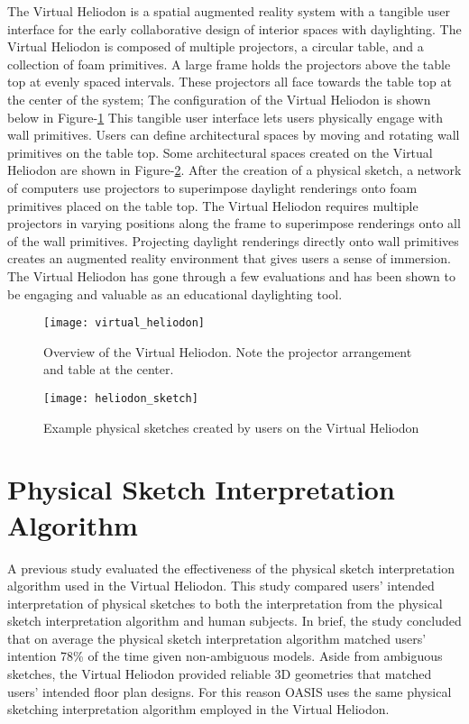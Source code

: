 	The Virtual Heliodon is a spatial augmented reality system with a tangible user interface for the early collaborative design of interior spaces with daylighting\cite{sheng2009virtual, cutler2009inferring,nasman2013physical,nasman2013evaluation,cutler2010interpreting}. 
	The Virtual Heliodon is composed of multiple projectors, a circular table, and a collection of foam primitives.  
	A large frame holds the projectors above the table top at evenly spaced intervals. 
	These projectors all face towards the table top at the center of the system;
	The configuration of the Virtual Heliodon is shown below in Figure-\ref{fig:virtual_heliodon}
	This tangible user interface lets users physically engage with wall primitives. 
	Users can define architectural spaces by moving and rotating wall primitives on the table top.
	Some architectural spaces created on the Virtual Heliodon are shown in Figure-\ref{fig:heliodon_sketch}.
	After the creation of a physical sketch, a network of computers use projectors to superimpose daylight renderings onto foam primitives placed on the table top.
	The Virtual Heliodon requires multiple projectors in varying positions along the frame to superimpose renderings onto all of the wall primitives.
	Projecting daylight renderings directly onto wall primitives creates an augmented reality environment that gives users a sense of immersion\cite{nasman2013evaluation}.
	The Virtual Heliodon has gone through a few evaluations and has been shown to be engaging and valuable as an educational daylighting tool\cite{nasman2013evaluation}.

	\begin{figure}[h]
	\centering
	\texttt{[image: virtual\_heliodon]}
	\caption{Overview of the Virtual Heliodon. Note the projector arrangement and table at the center.}
	\label{fig:virtual_heliodon}
	\end{figure}

	\begin{figure}[h]
	\centering
	\texttt{[image: heliodon\_sketch]}
	\caption{Example physical sketches created by users on the Virtual Heliodon}
	\label{fig:heliodon_sketch}
	\end{figure}

\section{Physical Sketch Interpretation Algorithm}

	A previous study evaluated the effectiveness of the physical sketch interpretation algorithm used in the Virtual Heliodon\cite{cutler2009inferring}.
	This study compared users' intended interpretation of physical sketches to both the
	interpretation from the physical sketch interpretation algorithm and human subjects.
	In brief, the study concluded that on average the physical sketch interpretation algorithm matched users' intention 78\% of the time given non-ambiguous models\cite{cutler2009inferring}.
	Aside from ambiguous sketches, the Virtual Heliodon provided reliable 3D geometries that matched users' intended floor plan designs.
	For this reason OASIS uses the same physical sketching interpretation algorithm employed in the Virtual Heliodon.\\

